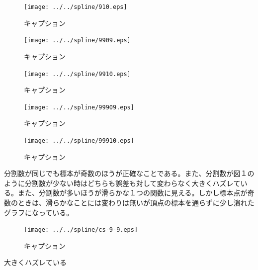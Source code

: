 \documentclass[titlepage, a4paper, 11pt, dvipdfmx]{jsarticle}
\begin{document}
\begin{figure}[H]
  \begin{center}%
    \texttt{[image: ../../spline/910.eps]}%
  \caption{キャプション}
  \label{Label}%
  \end{center}
\end{figure}



\begin{figure}[H]
  \begin{center}%
    \texttt{[image: ../../spline/9909.eps]}%
  \caption{キャプション}
  \label{Label}%
  \end{center}
\end{figure}


\begin{figure}[H]
  \begin{center}%
    \texttt{[image: ../../spline/9910.eps]}%
  \caption{キャプション}
  \label{Label}%
  \end{center}
\end{figure}

\begin{figure}[H]
  \begin{center}%
    \texttt{[image: ../../spline/99909.eps]}%
  \caption{キャプション}
  \label{Label}%
  \end{center}
\end{figure}


\begin{figure}[H]
  \begin{center}%
    \texttt{[image: ../../spline/99910.eps]}%
  \caption{キャプション}
  \label{Label}%
  \end{center}
\end{figure}
分割数が同じでも標本が奇数のほうが正確なことである。また、分割数が図１のように分割数が少ない時はどちらも誤差も対して変わらなく大きくハズレている。また、分割数が多いほうが滑らかな１つの関数に見える。しかし標本点が奇数のときは、滑らかなことには変わりは無いが頂点の標本を通らずに少し潰れたグラフになっている。

\begin{figure}[H]
  \begin{center}%
    \texttt{[image: ../../spline/cs-9-9.eps]}%
  \caption{キャプション}
  \label{Label}%
  \end{center}
\end{figure}
大きくハズレている
\end{document}

